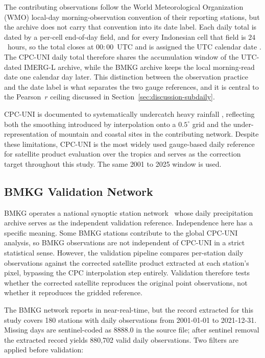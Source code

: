 The
contributing observations follow the World Meteorological
Organization (WMO) local-day morning-observation convention of
their reporting stations, but the archive does not carry that
convention into its date label. Each daily total is dated by a
per-cell end-of-day field, and for every Indonesian cell that
field is $24$~hours, so the total closes at $00{:}00$~UTC and is
assigned the UTC calendar date \citep{ref:cpcuni_readme}. The
CPC-UNI daily total therefore shares the accumulation window of
the UTC-dated IMERG-L archive, while the BMKG archive keeps the
local morning-read date one calendar day later. This distinction
between the observation practice and the date label is what
separates the two gauge references, and it is central to the
Pearson~$r$ ceiling discussed in
Section~\ref{sec:discussion-subdaily}.

CPC-UNI is documented to systematically undercatch heavy
rainfall \citep{ref:chen2008}, reflecting both the smoothing introduced by interpolation
onto a $0.5^{\circ}$ grid and the under-representation of
mountain and coastal sites in the contributing network. Despite
these limitations, CPC-UNI is the most widely used gauge-based
daily reference for satellite product evaluation over the tropics
and serves as the correction target throughout this study. The
same 2001 to 2025 window is used.

\subsection{BMKG Validation Network}

BMKG operates a national synoptic station network~\citep{ref:bmkg2006sk32}
whose daily precipitation archive serves as the independent
validation reference. Independence here has a specific meaning. Some BMKG
stations contribute to the global CPC-UNI analysis, so BMKG
observations are not independent of CPC-UNI in a strict
statistical sense. However, the validation pipeline compares
per-station daily observations against the corrected satellite
product extracted at each station's pixel, bypassing the CPC
interpolation step entirely. Validation therefore tests whether
the corrected satellite reproduces the original point
observations, not whether it reproduces the gridded reference.

The BMKG network reports in near-real-time, but the record
extracted for this study covers 180 stations with daily
observations from 2001-01-01 to 2021-12-31. Missing days are
sentinel-coded as $8888.0$ in the source file; after sentinel
removal the extracted record yields 880{,}702 valid daily
observations. Two filters are applied before validation:

